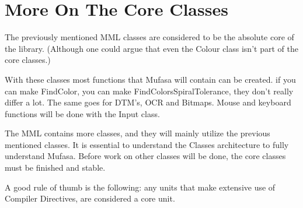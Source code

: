 \documentclass[a4paper, 10pt]{article}
\begin{document}
\section{More On The Core Classes}

The previously mentioned MML classes are considered to be the absolute core of the library. (Although one could argue that even the Colour class isn't part of the core classes.)

With these classes most functions that Mufasa will contain can be created. if you can make FindColor, you can make FindColorsSpiralTolerance, they don't really differ a lot. The same goes for DTM's, OCR and Bitmaps. Mouse and keyboard functions will be done with the Input class.

The MML contains more classes, and they will mainly utilize the previous mentioned classes.
It is essential to understand the Classes architecture to fully understand Mufasa.
Before work on other classes will be done, the core classes must be finished and stable.

A good rule of thumb is the following: any units that make extensive use of Compiler Directives, are considered a core unit.
\end{document}
